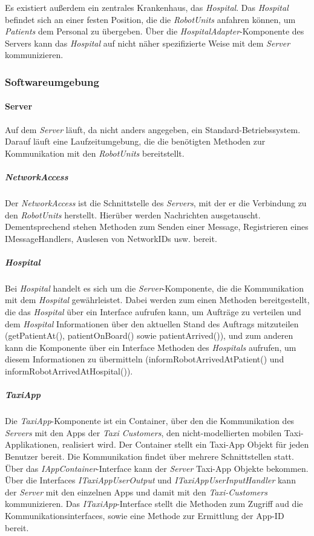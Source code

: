     Es existiert außerdem ein zentrales Krankenhaus, das \emph{Hospital}.
    Das \emph{Hospital} befindet sich an einer festen Position, die die \emph{RobotUnits} anfahren können, um \emph{Patients} dem Personal zu übergeben.
    Über die \emph{HospitalAdapter}-Komponente des Servers kann das \emph{Hospital} auf nicht näher spezifizierte Weise mit dem \emph{Server} kommunizieren.

  \subsubsection{Softwareumgebung}

    \paragraph{Server}\label{server}
    		Auf dem \emph{Server} läuft, da nicht anders angegeben, ein Standard-Betriebssystem.
    		Darauf läuft eine Laufzeitumgebung, die die benötigten Methoden zur Kommunikation mit den \emph{RobotUnits} bereitstellt.
    	\subparagraph{NetworkAccess}\label{networkaccess}
    		Der \emph{NetworkAccess} ist die Schnittstelle des \emph{Servers}, mit der er die Verbindung zu den \emph{RobotUnits} herstellt.
        Hierüber werden Nachrichten ausgetauscht.
    		Dementsprechend stehen Methoden zum Senden einer Message, Registrieren eines IMessageHandlers, Auslesen von NetworkIDs usw. bereit.
    	\subparagraph{Hospital}\label{hospital}
    		Bei \emph{Hospital} handelt es sich um die \emph{Server}-Komponente, die die Kommunikation mit dem \emph{Hospital} gewährleistet.
    		Dabei werden zum einen Methoden bereitgestellt, die das \emph{Hospital} über ein Interface aufrufen kann, um Aufträge zu verteilen und dem \emph{Hospital} Informationen über den aktuellen Stand des Auftrags mitzuteilen (getPatientAt(), patientOnBoard() sowie patientArrived()), und zum anderen kann die Komponente über ein Interface Methoden des \emph{Hospitals} aufrufen, um diesem Informationen zu übermitteln (informRobotArrivedAtPatient() und informRobotArrivedAtHospital()).
      \subparagraph{TaxiApp}
        Die \emph{TaxiApp}-Komponente ist ein Container, über den die Kommunikation des \emph{Servers} mit den Apps der \emph{Taxi Customers}, den nicht-modellierten mobilen Taxi-Applikationen, realisiert wird.
        Der Container stellt ein Taxi-App Objekt für jeden Benutzer bereit.
        Die Kommunikation findet über mehrere Schnittstellen statt.
        Über das \emph{IAppContainer}-Interface kann der \emph{Server} Taxi-App Objekte bekommen.
        Über die Interfaces \emph{ITaxiAppUserOutput} und \emph{ITaxiAppUserInputHandler} kann der \emph{Server} mit den einzelnen Apps und damit mit den \emph{Taxi-Customers} kommunizieren.
        Das \emph{ITaxiApp}-Interface stellt die Methoden zum Zugriff aud die Kommunikationsinterfaces, sowie eine Methode zur Ermittlung der App-ID bereit.
